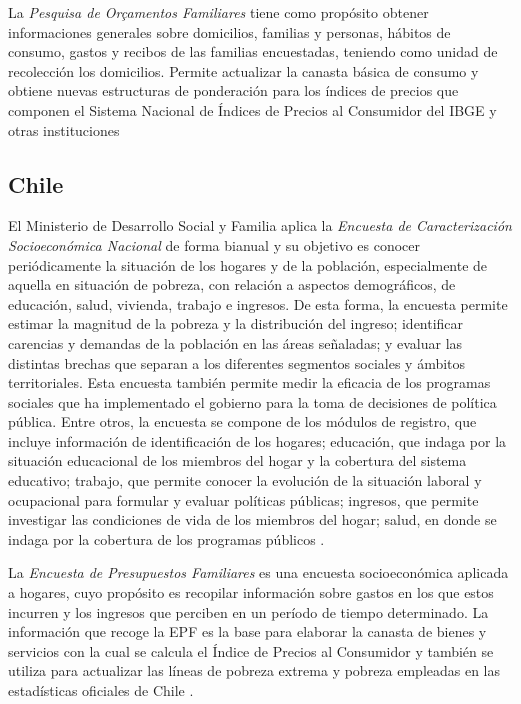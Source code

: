 \documentclass[
  12pt,
]{book}
\begin{document}
La \emph{Pesquisa de Orçamentos Familiares} tiene como propósito obtener informaciones generales sobre domicilios, familias y personas, hábitos de consumo, gastos y recibos de las familias encuestadas, teniendo como unidad de recolección los domicilios. Permite actualizar la canasta básica de consumo y obtiene nuevas estructuras de ponderación para los índices de precios que componen el Sistema Nacional de Índices de Precios al Consumidor del IBGE y otras instituciones \citep{IBGE-BR2018}

\hypertarget{chile}{%
\subsection{Chile}\label{chile}}

El Ministerio de Desarrollo Social y Familia aplica la \emph{Encuesta de Caracterización Socioeconómica Nacional} de forma bianual y su objetivo es conocer periódicamente la situación de los hogares y de la población, especialmente de aquella en situación de pobreza, con relación a aspectos demográficos, de educación, salud, vivienda, trabajo e ingresos. De esta forma, la encuesta permite estimar la magnitud de la pobreza y la distribución del ingreso; identificar carencias y demandas de la población en las áreas señaladas; y evaluar las distintas brechas que separan a los diferentes segmentos sociales y ámbitos territoriales. Esta encuesta también permite medir la eficacia de los programas sociales que ha implementado el gobierno para la toma de decisiones de política pública. Entre otros, la encuesta se compone de los módulos de registro, que incluye información de identificación de los hogares; educación, que indaga por la situación educacional de los miembros del hogar y la cobertura del sistema educativo; trabajo, que permite conocer la evolución de la situación laboral y ocupacional para formular y evaluar políticas públicas; ingresos, que permite investigar las condiciones de vida de los miembros del hogar; salud, en donde se indaga por la cobertura de los programas públicos \citep{MDS-CL_2015}.

La \emph{Encuesta de Presupuestos Familiares} es una encuesta socioeconómica aplicada a hogares, cuyo propósito es recopilar información sobre gastos en los que estos incurren y los ingresos que perciben en un período de tiempo determinado. La información que recoge la EPF es la base para elaborar la canasta de bienes y servicios con la cual se calcula el Índice de Precios al Consumidor y también se utiliza para actualizar las líneas de pobreza extrema y pobreza empleadas en las estadísticas oficiales de Chile \citep{INE_CL}.
\end{document}
